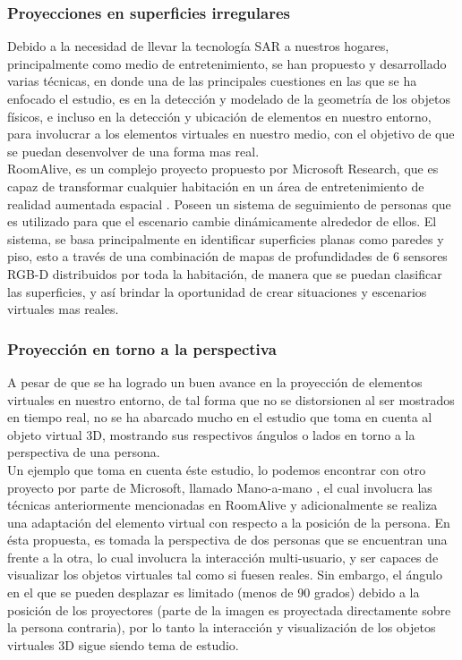 \documentclass[a4paper,openright,12pt]{report}
\begin{document}
\subsubsection{Proyecciones en superficies irregulares}
Debido a la necesidad de llevar la tecnología SAR a nuestros hogares, principalmente como medio de entretenimiento, se han propuesto y desarrollado varias técnicas, en donde una de las principales cuestiones en las que se ha enfocado el estudio, es en la detección y modelado de la geometría de los objetos físicos, e incluso en la detección y ubicación de elementos en nuestro entorno, para involucrar a los elementos virtuales en nuestro medio, con el objetivo de que se puedan desenvolver de una forma mas real.\\
RoomAlive, es un complejo proyecto propuesto por Microsoft Research, que es capaz de transformar cualquier habitación en un área de entretenimiento de realidad aumentada espacial \cite{jones2014}. Poseen un sistema de seguimiento de personas que es utilizado para que el escenario cambie dinámicamente alrededor de ellos. El sistema, se basa principalmente en identificar superficies planas como paredes y piso, esto a través de una combinación de mapas de profundidades de 6 sensores RGB-D distribuidos por toda la habitación, de manera que se puedan clasificar las superficies, y así brindar la oportunidad de crear situaciones y escenarios virtuales mas reales.\\
\subsubsection{Proyección en torno a la perspectiva}
A pesar de que se ha logrado un buen avance en la proyección de elementos virtuales en nuestro entorno, de tal forma que no se distorsionen al ser mostrados en tiempo real, no se ha abarcado mucho en el estudio que toma en cuenta al objeto virtual 3D, mostrando sus respectivos ángulos o lados en torno a la perspectiva de una persona.\\
Un ejemplo que toma en cuenta éste estudio, lo podemos encontrar con otro proyecto por parte de Microsoft, llamado Mano-a-mano \cite{benko2014}, el cual involucra las técnicas anteriormente mencionadas en RoomAlive y adicionalmente se realiza una adaptación del elemento virtual con respecto a la posición de la persona. En ésta propuesta, es tomada la perspectiva de dos personas que se encuentran una frente a la otra, lo cual involucra la interacción multi-usuario, y ser capaces de visualizar los objetos virtuales tal como si fuesen reales. Sin embargo, el ángulo en el que se pueden desplazar es limitado (menos de 90 grados) debido a la posición de los proyectores (parte de la imagen es proyectada directamente sobre la persona contraria), por lo tanto la interacción y visualización de los objetos virtuales 3D sigue siendo tema de estudio.\\
\end{document}
